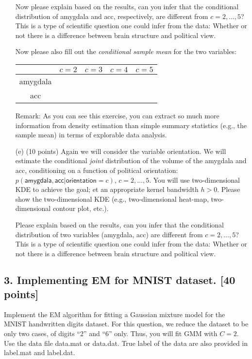 \documentclass[12pt]{article}
\begin{document}
\begin{enumerate}
 
Now please explain based on the results, can you infer that the conditional distribution of  \textsf{amygdala} and \textsf{acc}, respectively, are different from $c = 2, \ldots, 5$? This is a type of scientific question one could infer from the data: Whether or not there is a difference between brain structure and political view. 

Now please also fill out the {\it conditional sample mean} for the two variables: %
\begin{center}
\begin{tabular}{|c|c|c|c|c|}
\hline
& $c = 2$ & $c = 3$ & $c = 4$ & $c = 5$ \\\hline
\textsf{amygdala} & & & & \\\hline
\textsf{acc} & & & & \\\hline
\end{tabular}
\end{center}
Remark: As you can see this exercise, you can extract so much more information from density estimation than simple summary statistics (e.g., the sample mean) in terms of explorable data analysis.  
 
 \item[(e)] (10 points) Again we will consider the variable \textsf{orientation}. We will estimate the conditional {\it joint} distribution of the volume of the \textsf{amygdala} and \textsf{acc}, conditioning on  a function of political \textsf{orientation}: $p(\textsf{amygdala}, \textsf{acc}|\textsf{orientation}=c)$, $c = 2, \ldots, 5$. You will use two-dimensional KDE to achieve the goal; et an appropriate kernel bandwidth $h >0$. Please show the two-dimensional KDE (e.g., two-dimensional heat-map, two-dimensional contour plot, etc.). 
 
 Please explain based on the results, can you infer that the conditional distribution of two variables (\textsf{amygdala}, \textsf{acc}) are different from $c = 2, \ldots, 5$? This is a type of scientific question one could infer from the data: Whether or not there is a difference between brain structure and political view.
 
  
 \end{enumerate}


\subsection*{3. Implementing EM for MNIST dataset. [40 points]}

Implement the EM algorithm for fitting a Gaussian mixture model for the MNIST handwritten digits dataset. For this question, we reduce the dataset to be only two cases, of digits ``2'' and ``6'' only. Thus, you will fit GMM with $C = 2$. Use the data file \textsf{data.mat} or \textsf{data.dat}. True label of the data are also provided in \textsf{label.mat} and \textsf{label.dat}.
\\
\end{document}
